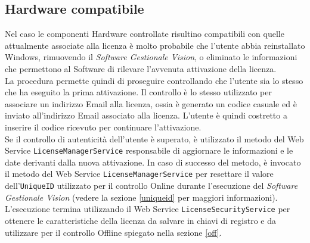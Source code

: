 \subsection{Hardware compatibile}
\label{hc}
Nel caso le componenti Hardware controllate risultino compatibili con quelle attualmente associate alla licenza è molto probabile che l'utente abbia reinstallato Windows, rimuovendo il \textit{Software Gestionale Vision}, o eliminato le informazioni che permettono al Software di rilevare l'avvenuta attivazione della licenza. 
\\La procedura permette quindi di proseguire controllando che l'utente sia lo stesso che ha eseguito la prima attivazione. Il controllo è lo stesso utilizzato per associare un indirizzo Email alla licenza, ossia è generato un codice casuale ed è inviato all'indirizzo Email associato alla licenza. L'utente è quindi costretto a inserire il codice ricevuto per continuare l'attivazione.
\\Se il controllo di autenticità dell'utente è superato, è utilizzato il metodo del Web Service \texttt{LicenseManagerService} responsabile di aggiornare le informazioni e le date derivanti dalla nuova attivazione. In caso di successo del metodo, è invocato il metodo del Web Service \texttt{LicenseManagerService} per resettare il valore dell’\texttt{UniqueID} utilizzato per il controllo Online durante l’esecuzione del \textit{Software Gestionale Vision} (vedere la sezione \ref{uniqueid} per maggiori informazioni).\\
L’esecuzione termina utilizzando il Web Service \texttt{LicenseSecurityService} per ottenere le caratteristiche della licenza da salvare in chiavi di registro e da utilizzare per il controllo Offline spiegato nella sezione \ref{off}. 


